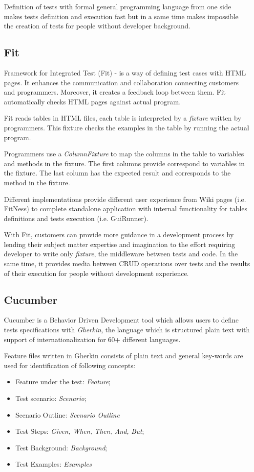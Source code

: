 Definition of tests with formal general programming language from one side makes tests definition and execution fast but in a same time makes impossible the creation of tests for people without developer background. 

\subsection{Fit}
Framework for Integrated Test (Fit) - is a way of defining test cases with HTML pages. It enhances the communication and collaboration connecting customers and programmers. Moreover, it creates a feedback loop between them. Fit automatically checks HTML pages against actual program\cite{fit}.

Fit reads tables in HTML files, each table is interpreted by a \textit{fixture} written by programmers. This fixture checks the examples in the table by running the actual program\cite{fitIntro}.

Programmers use a \textit{ColumnFixture} to map the columns in the table to variables and methods in the fixture. The first columns provide correspond to variables in the fixture. The last column has the expected result and corresponds to the method in the fixture\cite{fitIntro}.

Different implementations provide different user experience from Wiki pages (i.e. FitNess) to complete standalone application with internal functionality for tables definitions and tests execution (i.e. GuiRunner).

With Fit, customers can provide more guidance in a development process by lending their subject matter expertise and imagination to the effort\cite{fit} requiring developer to write only \textit{fixture}, the middleware between tests and code. In the same time, it provides media between  CRUD operations over tests and the results of their execution for people without development experience.

\subsection{Cucumber}
Cucumber is a Behavior Driven Development tool which allows users to define tests specifications with \textit{Gherkin}, the language which is structured plain text with support of internationalization for 60+ different languages\cite{cuceRef}.

Feature files written in Gherkin consists of plain text and general key-words are used for identification of following concepts:
\begin{itemize}
	\item Feature under the test: \textit{Feature};
	\item Test scenario: \textit{Scenario};
	\item Scenario Outline: \textit{Scenario Outline}
	\item Test Steps: \textit{Given, When, Then, And, But};
	\item Test Background:  \textit{Background};
	\item Test Examples: \textit{Examples}
\end{itemize}

